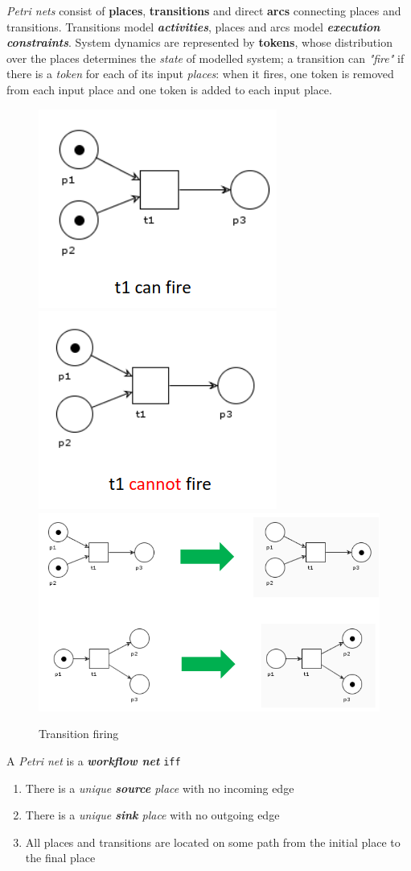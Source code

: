 \textit{Petri nets} consist of \textbf{places}, \textbf{transitions} and direct \textbf{arcs} connecting places and transitions.
Transitions model \textbf{\textit{activities}}, places and arcs model \textbf{\textit{execution constraints}}.
System dynamics are represented by \textbf{tokens}, whose distribution over the places
determines the \textit{state} of modelled system;
a transition can \textit{"fire"} if there is a \textit{token} for each of its input \textit{places}:
when it fires, one token is removed from each input place and one token is added to each input place.
\begin{figure}[htbp]
   \centering
   \includegraphics[width=0.225\columnwidth]{images/petri_firetoken1.png}
   \includegraphics[width=0.225\columnwidth]{images/petri_firetoken2.png}
   \includegraphics[width=0.45\columnwidth]{images/petri_firetoken3.png}
   \caption{Transition firing}
   \label{fig:petri_firetoken}
\end{figure}
\nl

A \textit{Petri net} is a \textbf{\textit{workflow net}} \texttt{iff}
\begin{enumerate}
   \item There is a \textit{unique \textbf{source} place} with no incoming edge
   \item There is a \textit{unique \textbf{sink} place} with no outgoing edge
   \item All places and transitions are located on some path from
   the initial place to the final place
\end{enumerate}

